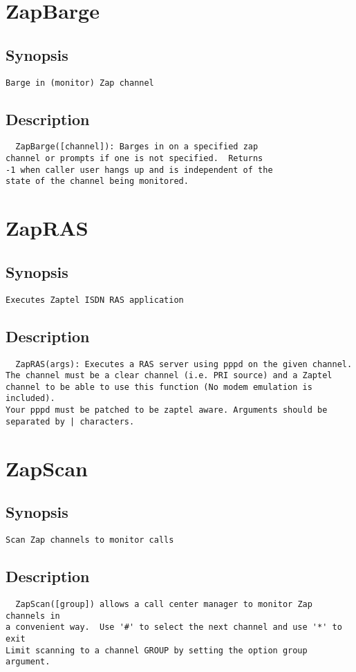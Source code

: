 \section{ZapBarge}
\subsection{Synopsis}
\begin{verbatim}
Barge in (monitor) Zap channel
\end{verbatim}
\subsection{Description}
\begin{verbatim}
  ZapBarge([channel]): Barges in on a specified zap
channel or prompts if one is not specified.  Returns
-1 when caller user hangs up and is independent of the
state of the channel being monitored.
\end{verbatim}


\section{ZapRAS}
\subsection{Synopsis}
\begin{verbatim}
Executes Zaptel ISDN RAS application
\end{verbatim}
\subsection{Description}
\begin{verbatim}
  ZapRAS(args): Executes a RAS server using pppd on the given channel.
The channel must be a clear channel (i.e. PRI source) and a Zaptel
channel to be able to use this function (No modem emulation is included).
Your pppd must be patched to be zaptel aware. Arguments should be
separated by | characters.

\end{verbatim}


\section{ZapScan}
\subsection{Synopsis}
\begin{verbatim}
Scan Zap channels to monitor calls
\end{verbatim}
\subsection{Description}
\begin{verbatim}
  ZapScan([group]) allows a call center manager to monitor Zap channels in
a convenient way.  Use '#' to select the next channel and use '*' to exit
Limit scanning to a channel GROUP by setting the option group argument.

\end{verbatim}


